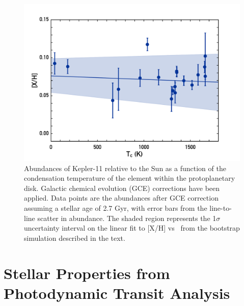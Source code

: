 \documentclass[oneside]{emulateapj}
\begin{document}
\begin{figure}
\centering
\includegraphics[scale=0.45]{K11_Tc_linear}
\caption{Abundances of Kepler-11 relative to the Sun as a function of the condensation temperature of the element within the protoplanetary disk. Galactic chemical evolution (GCE) corrections have been applied. Data points are the abundances after GCE correction assuming a stellar age of 2.7 Gyr, with error bars from the line-to-line scatter in abundance. The shaded region represents the 1$\sigma$ uncertainty interval on the linear fit to [X/H] vs \tc\ from the bootstrap simulation described in the text.}
\label{fig:tc}
\end{figure}




\section{Stellar Properties from Photodynamic Transit Analysis}
\label{s:ttvs}
\end{document}
